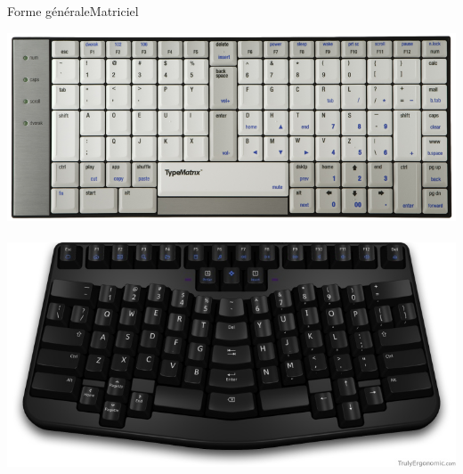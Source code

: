 \begin{frame}{Forme générale}{Matriciel}
	\begin{center}
		\includegraphics[scale=0.25]{images/2030-dvorak} \\~\\
		\includegraphics[scale=0.25]{images/t_e_keyboard}
	\end{center}
\end{frame}

